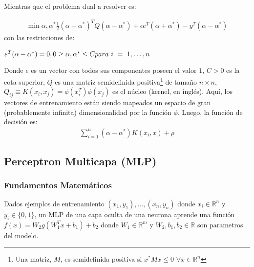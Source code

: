   Mientras que el problema dual a resolver es:

  \begin{align}
    \min\limits{\alpha, \alpha^{*}} \frac{1}{2} (\alpha - \alpha^{*})^{T}
    Q(\alpha - \alpha^{*}) + \epsilon e^{T} (\alpha + \alpha^{*}) -
    y^{T} (\alpha - \alpha^{*})
  \end{align}
  con las restricciones de:

  \begin{math}
    e^{T} (\alpha - \alpha^{*}) = 0, \\
    0 \geq \alpha, \alpha^{*} \leq C \\
    para\ i\ =\ 1, \dots, n
  \end{math}

  Donde $e$ es un vector con todos sus componentes poseen el valor $1$, $C > 0$
  es la cota superior, $Q$ es una matriz semidefinida
  positiva\footnote{Una matriz, $M$, es semidefinida positiva si $x^{*}Mx \leq 0$
  $\forall x \in \mathbb{R}^{n}$} de tamaño $n \times n$,
  $Q_{ij} \equiv K(x_{i}, x_{j}) = \phi(x_{i}^{T})\phi(x_{j})$ es el núcleo
  (kernel, en inglés). Aquí, los vectores de entrenamiento están siendo mapeados
  un espacio de gran (probablemente infinita) dimensionalidad por la función
  $\phi$.
  Luego, la función de decisión es:
  \begin{align}
    \sum_{i = 1}^{n} (\alpha - \alpha^{*})K(x_{i}, x) + \rho
  \end{align}

\subsection{Perceptron Multicapa (MLP)}


\subsubsection{Fundamentos Matemáticos}
Dados ejemplos de entrenamiento $(x_{1}, y_{1}), \dots, (x_{n}, y_{n})$
donde $x_{i} \in \mathbb{R}^{n}$ y $y_{i} \in \{0,1\}$, un MLP de una capa oculta
de una neurona aprende una función $f(x) = W_{2}g(W_{1}^{T} x + b_{1}) + b_{2}$
donde $W_{1} \in \mathbb{R}^{m}$ y $W_{2}, b_{1}, b_{2} \in \mathbb{R}$ son
parametros del modelo.



